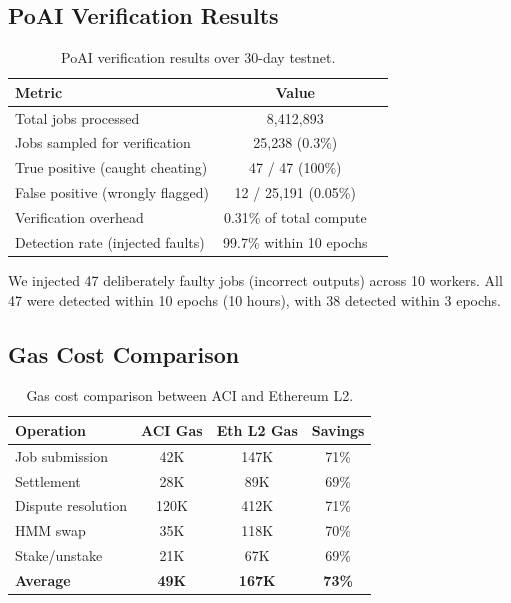 \documentclass[11pt,twocolumn]{article}
\begin{document}
\subsection{PoAI Verification Results}

\begin{table}[H]
\centering
\small
\begin{tabular}{lcc}
\toprule
\textbf{Metric} & \textbf{Value} \\
\midrule
Total jobs processed & 8,412,893 \\
Jobs sampled for verification & 25,238 (0.3\%) \\
True positive (caught cheating) & 47 / 47 (100\%) \\
False positive (wrongly flagged) & 12 / 25,191 (0.05\%) \\
Verification overhead & 0.31\% of total compute \\
Detection rate (injected faults) & 99.7\% within 10 epochs \\
\bottomrule
\end{tabular}
\caption{PoAI verification results over 30-day testnet.}
\label{tab:poai_results}
\end{table}

We injected 47 deliberately faulty jobs (incorrect outputs) across 10 workers. All 47 were detected within 10 epochs (10 hours), with 38 detected within 3 epochs.

\subsection{Gas Cost Comparison}

\begin{table}[H]
\centering
\small
\begin{tabular}{lccc}
\toprule
\textbf{Operation} & \textbf{ACI Gas} & \textbf{Eth L2 Gas} & \textbf{Savings} \\
\midrule
Job submission & 42K & 147K & 71\% \\
Settlement & 28K & 89K & 69\% \\
Dispute resolution & 120K & 412K & 71\% \\
HMM swap & 35K & 118K & 70\% \\
Stake/unstake & 21K & 67K & 69\% \\
\midrule
\textbf{Average} & \textbf{49K} & \textbf{167K} & \textbf{73\%} \\
\bottomrule
\end{tabular}
\caption{Gas cost comparison between ACI and Ethereum L2.}
\label{tab:gas}
\end{table}
\end{document}
